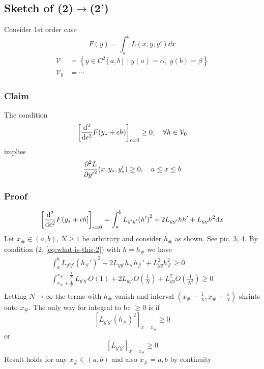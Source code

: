 \documentclass[12pt,twoside]{article}
\begin{document}
\subsection{Sketch of (2)$\rightarrow$(2')}
Consider 1st order case
\begin{equation*}
  F(y) = \int_a^b L(x,y,y')\dd{x}
\end{equation*}
\begin{equation*}
  \begin{aligned}
    \mathcal{V} &= \left\{ y\in C^2[a,b]\;|\;y(a)=\alpha,\;y(b)=\beta \right\} \\
    \mathcal{V}_0 &= \cdots
  \end{aligned}
\end{equation*}
\subsubsection{Claim}
The condition
\begin{equation}
  \label{eq:what-is-this-2}
  {\left[ \od[2]{}{\epsilon}F(y_*+\epsilon h) \right]}_{\epsilon=0}\ge 0,\quad \forall h\in \mathcal{V}_0
\end{equation}
implies
\begin{equation}
  \label{eq:what-is-this-2-prime}
  \pd[2]{L}{y'}(x,y_*,y_*')\ge 0,\quad a \le x \le b
\end{equation}

\subsubsection{Proof}
\begin{equation*}
  {\left[ \od[2]{}{\epsilon}F(y_*+\epsilon h] \right]}_{\epsilon=0} = \int_a^bL_{y'y'}{(h')}^2 + 2L_{yy'}hh' + L_{yy}h^2 \dd{x}
\end{equation*}
Let $x_{\#}\in(a,b)$, $N\ge1$ be arbitrary and consider $h_{\#}$ as shown. See
pic. 3, 4. By condition (2, \cref{eq:what-is-this-2}) with $h=h_{\#}$ we have
\begin{equation*}
  \begin{aligned}
    \int_a^bL_{y'y'}{(h_{\#}')}^2 + 2L_{yy'}h_{\#}h_{\#}' + L_{yy}^2h_{\#}^2 \ge 0 \\
    \int_{x_{\#}+\frac{1}{N}}^{x_{\#}-\frac{1}{N}}L_{y'y'}O(1) + 2L_{yy'}O\left(
      \frac{1}{N} \right) + L_{yy}^2O\left( \frac{1}{N^2} \right) \ge 0 \\
  \end{aligned}
\end{equation*}
Letting $N\rightarrow\infty$ the terms with $h_{\#}$ vanish and interval
$\left(x_{\#}-\frac{1}{N},x_{\#}+\frac{1}{N}\right)$ shrints onto $x_{\#}$. The
only way for integral to be $\ge 0$ is if
\begin{equation*}
  {\left[ L_{y'y'}{(h_{\#})}^2 \right]}_{x=x_{\#}} \ge 0
\end{equation*}
or
\begin{equation*}
  {\left[ L_{y'y'} \right]}_{x=x_{\#}} \ge 0
\end{equation*}
Result holds for any $x_{\#}\in(a,b)$ and also $x_{\#}=a,b$ by continuity
\end{document}
